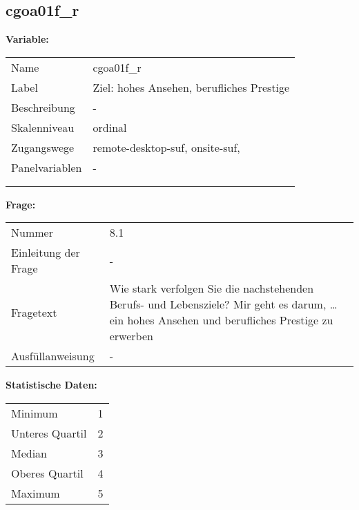 	
	
	\subsection{cgoa01f\_r}
	\label{subSection:cgoa01f_r}

	\noindent\textbf{Variable:}\\
		\begin{tabular}{lL{11.3cm}}
			\label{tableVariable:cgoa01f_r}
			Name & cgoa01f\_r \\
			Label & Ziel: hohes Ansehen, berufliches Prestige \\
			Beschreibung & - \\
			Skalenniveau & ordinal \\
			Zugangswege &
				remote-desktop-suf,
				onsite-suf,
 \\
			Panelvariablen & -
			 \\
			 \\
 \\
		\end{tabular}

		\vspace*{1 cm}
		\noindent\textbf{Frage:}\\
		\begin{tabular}{lL{11.3cm}}
			\label{tableQuestion:cgoa01f_r}
			Nummer & 8.1 \\
			Einleitung der Frage & - \\
			Fragetext & Wie stark verfolgen Sie die nachstehenden Berufs- und Lebensziele?
Mir geht es darum, …
ein hohes Ansehen und berufliches Prestige zu erwerben \\
			Ausfüllanweisung & - \\
		\end{tabular}


		\vspace*{1 cm}
		\noindent\textbf{Statistische Daten:}\\
			\begin{tabular}{ll}
				\label{tableStatistics:cgoa01f_r}
					Minimum & 1 \\
					Unteres Quartil & 2 \\
					Median & 3 \\
					Oberes Quartil & 4 \\
					Maximum & 5 \\
			\end{tabular}



